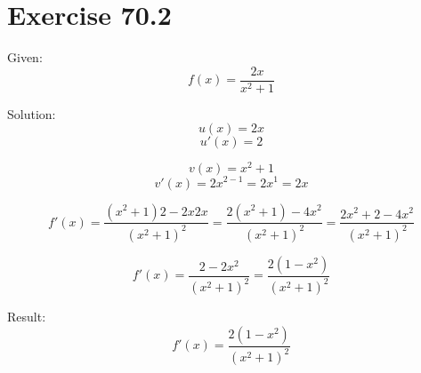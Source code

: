\documentclass[a4paper, 10pt]{scrartcl}
\begin{document}
\section{Exercise 70.2}

Given:
\[f(x) = \frac{2x}{x^{2} + 1}\]

Solution:
\[u(x) = 2x\]
\[u'(x) = 2\]

\[v(x) = x^{2} + 1\]
\[v'(x) = 2x^{2 - 1} = 2x^{1} = 2x\]

\[f'(x) = \frac{(x^{2} + 1)2 - 2x2x}{(x^{2} + 1)^{2}} =
          \frac{2(x^{2} + 1) - 4x^{2}}{(x^{2} + 1)^{2}} =
          \frac{2x^{2} + 2 - 4x^{2}}{(x^{2} + 1)^{2}}\]

\[f'(x) = \frac{2 - 2x^{2}}{(x^{2} + 1)^{2}} = \frac{2(1 - x^{2})}{(x^{2} + 1)^{2}}\]

Result:
\[f'(x) = \frac{2(1 - x^{2})}{(x^{2} + 1)^{2}}\]
\end{document}
